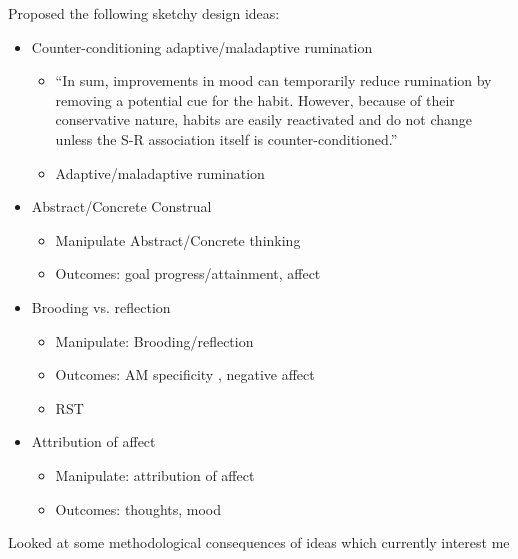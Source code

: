\documentclass[british]{article}
\begin{document}
Proposed the following sketchy design ideas:

\begin{itemize}
  \item Counter-conditioning adaptive/maladaptive rumination
  \begin{itemize}
    \item \enquote{In sum, improvements in mood can temporarily
    reduce rumination by removing a potential cue for the habit.
    However, because of their conservative nature, habits are easily
    reactivated and do not change unless the S-R association itself is
    counter-conditioned.} \parencite{watkins_habitgoal_2014}
    \item Adaptive/maladaptive rumination \parencite{joormann_adadptive_2006}
  \end{itemize}

  \item Abstract/Concrete Construal
  \begin{itemize}
    \item Manipulate Abstract/Concrete thinking \parencite{watkins_constructive_2008}
    \item Outcomes: goal progress/attainment, affect
  \end{itemize}

  \item Brooding vs. reflection
  \begin{itemize}
    \item Manipulate: Brooding/reflection \parencite{moberly_ruminative_2008}
    \item Outcomes: AM specificity \parencite{debeer_associations_2009},
    negative affect \parencite{moberly_ruminative_2008}
    \item RST \parencite{nolen-hoeksema_responses_1991}
  \end{itemize}

  \item Attribution of affect
  \begin{itemize}
    \item Manipulate: attribution of affect \parencite{clore_how_2007}
    \item Outcomes: thoughts, mood
  \end{itemize}
\end{itemize}

Looked at some methodological consequences of ideas which currently interest me
\end{document}
